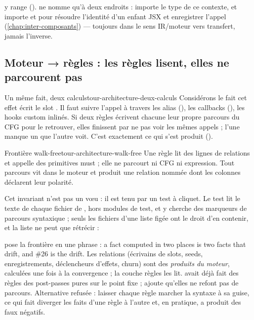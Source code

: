 
 y range  ().  ne nomme  qu'à deux endroits :  importe le type de ce contexte, et  importe  et  pour résoudre l'identité d'un enfant JSX et enregistrer l'appel (\cref{chap:inter-composants}) --- toujours dans le sens IR/moteur vers transfert, jamais l'inverse.

\subsection{Moteur → règles : les règles lisent, elles ne parcourent pas}

\begin{exemple}{Un même fait, deux calculs}{tour-architecture-deux-calculs}
Considérons le fait \og cet effet écrit le slot \fg{}. Il faut suivre l'appel  à travers les alias (), les callbacks (), les hooks custom inlinés. Si deux règles écrivent chacune leur propre parcours du CFG pour le retrouver, elles finissent par ne pas voir les mêmes appels ; l'une manque un  que l'autre voit. C'est exactement ce qui s'est produit ().
\end{exemple}

\begin{invariant}{Frontière walk-free}{tour-architecture-walk-free}
Une règle lit des lignes de relations et appelle des primitives must ; elle ne parcourt ni CFG ni expression. Tout parcours vit dans le moteur et produit une relation nommée dont les colonnes déclarent leur polarité.
\end{invariant}

Cet invariant n'est pas un vœu : il est tenu par un test à cliquet. Le test lit le texte de chaque fichier de , hors modules de test, et y cherche des marqueurs de parcours syntaxique ; seuls les fichiers d'une liste figée ont le droit d'en contenir, et la liste ne peut que rétrécir :


\begin{decision}[ADR-42]
 pose la frontière en une phrase : \og a fact computed in two places is two facts that drift, and \#26 is the drift\fg{}. Les relations (écrivains de slots, seeds, enregistrements, déclencheurs d'effets, churn) sont des \emph{produits du moteur}, calculées une fois à la convergence ; la couche règles les lit.  avait déjà fait des règles des \og post-passes pures\fg{} sur le point fixe ;  ajoute qu'elles ne refont pas de parcours. Alternative refusée : laisser chaque règle marcher la syntaxe à sa guise, ce qui fait diverger les faits d'une règle à l'autre et, en pratique, a produit des faux négatifs.
\end{decision}

